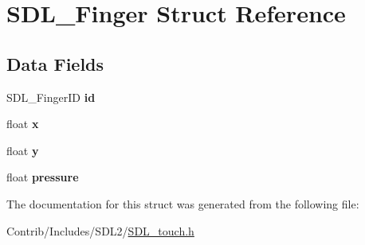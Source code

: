 \hypertarget{struct_s_d_l___finger}{}\section{S\+D\+L\+\_\+\+Finger Struct Reference}
\label{struct_s_d_l___finger}
\subsection*{Data Fields}
\begin{DoxyCompactItemize}
\item 
S\+D\+L\+\_\+\+Finger\+ID {\bfseries id}\hypertarget{struct_s_d_l___finger_a06eb039fdc8749dc760a21024c9068e2}{}\label{struct_s_d_l___finger_a06eb039fdc8749dc760a21024c9068e2}

\item 
float {\bfseries x}\hypertarget{struct_s_d_l___finger_ad0da36b2558901e21e7a30f6c227a45e}{}\label{struct_s_d_l___finger_ad0da36b2558901e21e7a30f6c227a45e}

\item 
float {\bfseries y}\hypertarget{struct_s_d_l___finger_aa4f0d3eebc3c443f9be81bf48561a217}{}\label{struct_s_d_l___finger_aa4f0d3eebc3c443f9be81bf48561a217}

\item 
float {\bfseries pressure}\hypertarget{struct_s_d_l___finger_ac870e1249bab4a2a68cc4126761d24ef}{}\label{struct_s_d_l___finger_ac870e1249bab4a2a68cc4126761d24ef}

\end{DoxyCompactItemize}


The documentation for this struct was generated from the following file\+:\begin{DoxyCompactItemize}
\item 
Contrib/\+Includes/\+S\+D\+L2/\hyperlink{_s_d_l__touch_8h}{S\+D\+L\+\_\+touch.\+h}\end{DoxyCompactItemize}
